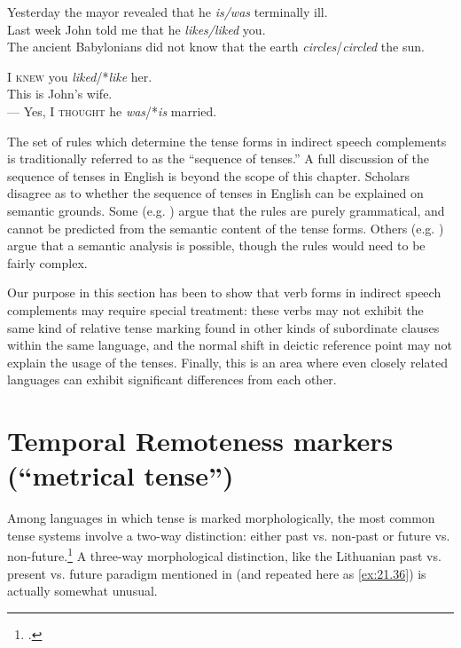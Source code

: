 \ea \label{ex:21.34}
\ea  Yesterday the mayor revealed that he \textit{is/was} terminally ill.\\
\ex Last week John told me that he \textit{likes/liked} you.\\
\ex The ancient Babylonians did not know that the earth \textit{circles}/\textit{circled} the sun.
                       \z
\z

\ea \label{ex:21.35}
\ea  I \textsc{knew} you \textit{liked}/*\textit{like} her.\\
\ex This is John’s wife.\\
  — Yes, I \textsc{thought} he \textit{was}/*\textit{is} married.
                       \z
\z


The set of rules which determine the tense forms in indirect speech complements is traditionally referred to as the “sequence of tenses.” A full discussion of the sequence of tenses in English is beyond the scope of this chapter. Scholars disagree as to whether the sequence of tenses in English can be explained on semantic grounds. Some (e.g. \citealt{Comrie1985}) argue that the rules are purely grammatical, and cannot be predicted from the semantic content of the tense forms. Others (e.g. \citealt{Declerck1991}) argue that a semantic analysis is possible, though the rules would need to be fairly complex.



Our purpose in this section has been to show that verb forms in indirect speech complements may require special treatment: these verbs may not exhibit the same kind of relative tense marking found in other kinds of subordinate clauses within the same language, and the normal shift in deictic reference point may not explain the usage of the tenses. Finally, this is an area where even closely related languages can exhibit significant differences from each other.


\section{Temporal Remoteness markers (“metrical tense”)}\label{sec:21.5}

Among languages in which tense is marked morphologically, the most common tense systems involve a two-way distinction: either past vs. non-past or future vs. non-future.\footnote{\citet{ChungTimberlake1985}.} A three-way morphological distinction, like the Lithuanian past vs. present vs. future paradigm mentioned in  (and repeated here as \ref{ex:21.36}) is actually somewhat unusual.


